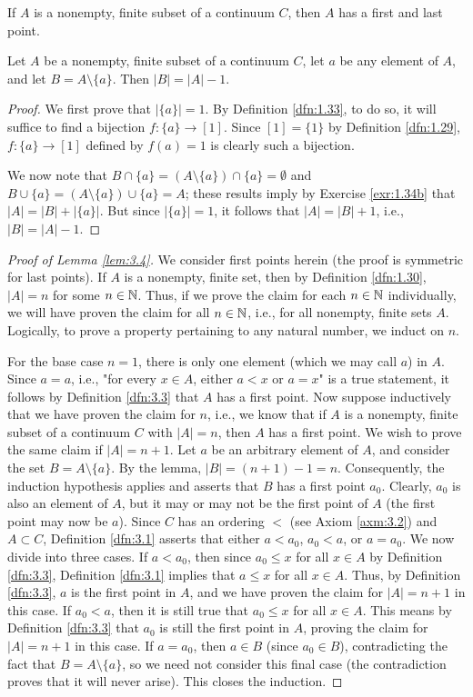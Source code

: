 \documentclass[../main.tex]{subfiles}
\begin{document}
\begin{lemma}\label{lem:3.4}
    If $A$ is a nonempty, finite subset of a continuum $C$, then $A$ has a first and last point.
    \begin{lemma*}
        Let $A$ be a nonempty, finite subset of a continuum $C$, let $a$ be any element of $A$, and let $B=A\setminus\{a\}$. Then $|B|=|A|-1$.
        \begin{proof}
            We first prove that $|\{a\}|=1$. By Definition \ref{dfn:1.33}, to do so, it will suffice to find a bijection $f:\{a\}\to[1]$. Since $[1]=\{1\}$ by Definition \ref{dfn:1.29}, $f:\{a\}\to[1]$ defined by $f(a)=1$ is clearly such a bijection.\par
            We now note that $B\cap\{a\}=(A\setminus\{a\})\cap\{a\}=\emptyset$ and $B\cup\{a\}=(A\setminus\{a\})\cup\{a\}=A$; these results imply by Exercise \ref{exr:1.34b} that $|A|=|B|+|\{a\}|$. But since $|\{a\}|=1$, it follows that $|A|=|B|+1$, i.e., $|B|=|A|-1$.
        \end{proof}
    \end{lemma*}
    \begin{proof}[Proof of Lemma \ref{lem:3.4}]
        We consider first points herein (the proof is symmetric for last points). If $A$ is a nonempty, finite set, then by Definition \ref{dfn:1.30}, $|A|=n$ for some $n\in\mathbb{N}$. Thus, if we prove the claim for each $n\in\mathbb{N}$ individually, we will have proven the claim for all $n\in\mathbb{N}$, i.e., for all nonempty, finite sets $A$. Logically, to prove a property pertaining to any natural number, we induct on $n$.\par
        For the base case $n=1$, there is only one element (which we may call $a$) in $A$. Since $a=a$, i.e., "for every $x\in A$, either $a<x$ or $a=x$" is a true statement, it follows by Definition \ref{dfn:3.3} that $A$ has a first point. Now suppose inductively that we have proven the claim for $n$, i.e., we know that if $A$ is a nonempty, finite subset of a continuum $C$ with $|A|=n$, then $A$ has a first point. We wish to prove the same claim if $|A|=n+1$. Let $a$ be an arbitrary element of $A$, and consider the set $B=A\setminus\{a\}$. By the lemma, $|B|=(n+1)-1=n$. Consequently, the induction hypothesis applies and asserts that $B$ has a first point $a_0$. Clearly, $a_0$ is also an element of $A$, but it may or may not be the first point of $A$ (the first point may now be $a$). Since $C$ has an ordering $<$ (see Axiom \ref{axm:3.2}) and $A\subset C$, Definition \ref{dfn:3.1} asserts that either $a<a_0$, $a_0<a$, or $a=a_0$. We now divide into three cases. If $a<a_0$, then since $a_0\leq x$ for all $x\in A$ by Definition \ref{dfn:3.3}, Definition \ref{dfn:3.1} implies that $a\leq x$ for all $x\in A$. Thus, by Definition \ref{dfn:3.3}, $a$ is the first point in $A$, and we have proven the claim for $|A|=n+1$ in this case. If $a_0<a$, then it is still true that $a_0\leq x$ for all $x\in A$. This means by Definition \ref{dfn:3.3} that $a_0$ is still the first point in $A$, proving the claim for $|A|=n+1$ in this case. If $a=a_0$, then $a\in B$ (since $a_0\in B$), contradicting the fact that $B=A\setminus\{a\}$, so we need not consider this final case (the contradiction proves that it will never arise). This closes the induction.

\end{proof}
\end{lemma}
\end{document}
